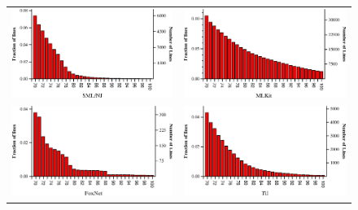 \documentclass[12pt,abstracton]{scrartcl}
\begin{document}
\begin{figure}[h!]
\centering
\begin{tabular}{cc}
\includegraphics[scale=0.72]{smlnj.eps} & \includegraphics[scale=0.72]{mlkit.eps} \\
\includegraphics[scale=0.72]{foxnet.eps} & \includegraphics[scale=0.72]{til.eps} \\

\end{tabular}
\end{figure}
\end{document}
